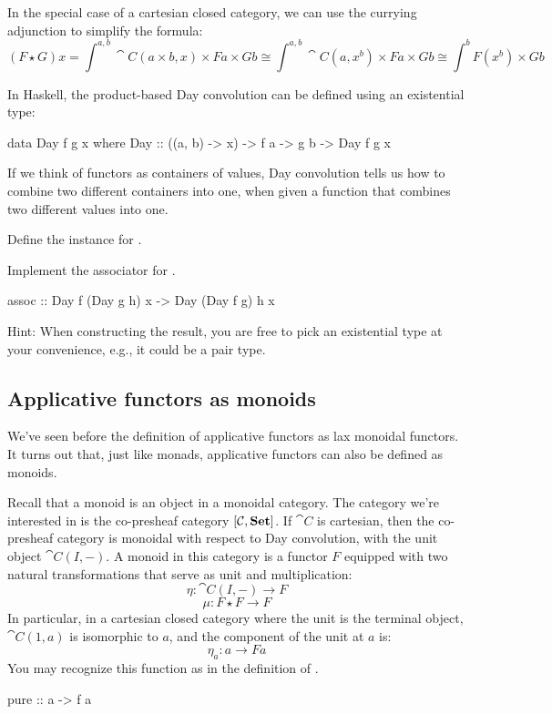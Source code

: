 \documentclass[DaoFP]{subfiles}
\begin{document}
In the special case of a cartesian closed category, we can use the currying adjunction to simplify the formula:
\[ (F \star G) x = \int^{a, b} \cat C (a \times b, x) \times F a \times G b \cong  \int^{a, b} \cat C (a, x^b) \times F a \times G b \cong  \int^{b}  F (x^b) \times G b\]

In Haskell, the product-based Day convolution can be defined using an existential type:
\begin{haskell}
data Day f g x where
  Day :: ((a, b) -> x) -> f a -> g b -> Day f g x
\end{haskell}

If we think of functors as containers of values, Day convolution tells us how to combine two different containers into one, when given a function that combines two different values into one. 

\begin{exercise}
Define the  instance for .
\end{exercise}

\begin{exercise}
Implement the associator for .
\begin{haskell}
assoc :: Day f (Day g h) x -> Day (Day f g) h x
\end{haskell}
Hint: When constructing the result, you are free to pick an existential type at your convenience, e.g., it could be a pair type.
\end{exercise}


\subsection{Applicative functors as monoids}
 
 We've seen before the definition of applicative functors as lax monoidal functors. It turns out that, just like monads, applicative functors can also be defined as monoids. 
 
Recall that a monoid is an object in a monoidal category. The category we're interested in is the co-presheaf category $[\mathcal{C}, \mathbf{Set}]$. If $\cat C$ is cartesian, then the co-presheaf category is monoidal with respect to Day convolution, with the unit object $\cat C(I, -)$. A monoid in this category is a functor $F$ equipped with two natural transformations that serve as unit and multiplication:
\[ \eta \colon \cat C(I, -) \to F \]
\[ \mu \colon F \star F \to F \]
In particular, in a cartesian closed category where the unit is the terminal object, $\cat C(1, a)$ is isomorphic to $a$, and the component of the unit at $a$ is:
\[ \eta_a \colon a \to F a \] 
You may recognize this function as  in the definition of .
\begin{haskell}
pure :: a -> f a
\end{haskell}
\end{document}
